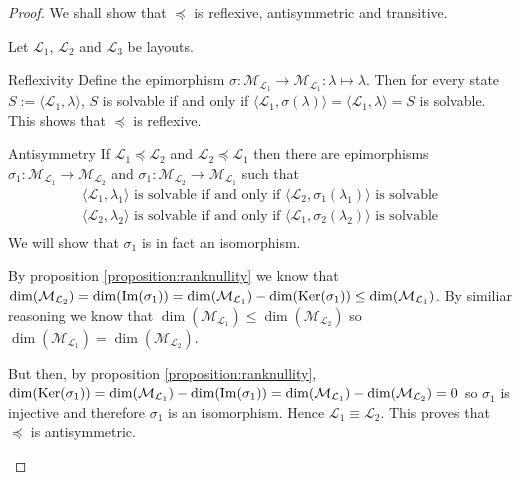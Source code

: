 \begin{proof}
	We shall show that $\preceq$ is reflexive, antisymmetric and transitive.
	
	Let $\mathcal{L}_{1}$, $\mathcal{L}_{2}$ and $\mathcal{L}_{3}$ be
	layouts.
	\begin{namedlist}[Transitivity]
		\item[Reflexivity] Define the epimorphism $\sigma :
		\mathcal{M}_{\mathcal{L}_{1}} \rightarrow
		\mathcal{M}_{\mathcal{L}_{1}} : \lambda \mapsto \lambda$. Then
		for every state $S:=\langle\mathcal{L}_{1},\lambda\rangle$, $S$
		is solvable if and only if
		$\langle\mathcal{L}_{1},\sigma(\lambda)\rangle =
		\langle\mathcal{L}_{1},\lambda\rangle = S$ is solvable. This
		shows that $\preceq$ is reflexive.
		
		\item[Antisymmetry] If $\mathcal{L}_{1} \preceq \mathcal{L}_{2}$
		and $\mathcal{L}_{2} \preceq \mathcal{L}_{1}$ then there are
		epimorphisms $\sigma_{1} : \mathcal{M}_{\mathcal{L}_{1}}
		\rightarrow \mathcal{M}_{\mathcal{L}_{2}}$ and $\sigma_{1} :
		\mathcal{M}_{\mathcal{L}_{2}} \rightarrow
		\mathcal{M}_{\mathcal{L}_{1}}$ such that
		\[
			\begin{array}{c}
				\langle\mathcal{L}_{1},\lambda_{1}\rangle \text{ is solvable if and only if } \langle\mathcal{L}_{2},\sigma_{1}(\lambda_{1})\rangle \text{ is solvable} \\
				\langle\mathcal{L}_{2},\lambda_{2}\rangle \text{ is solvable if and only if } \langle\mathcal{L}_{1},\sigma_{2}(\lambda_{2})\rangle \text{ is solvable} \\
			\end{array}
		\]
		We will show that $\sigma_{1}$ is in fact an isomorphism. 
		
		By proposition \ref{proposition:ranknullity} we know that
		$\dim( \mathcal{M}_{\mathcal{L}_{2}} ) = \dim(\operatorname{Im}(\sigma_{1})) =
		\dim( \mathcal{M}_{\mathcal{L}_{1}} ) - \dim(\operatorname{Ker}(\sigma_{1}))
		\le \dim( \mathcal{M}_{\mathcal{L}_{1}} )$. By similiar
		reasoning we know that $\dim( \mathcal{M}_{\mathcal{L}_{1}} )
		\le \dim( \mathcal{M}_{\mathcal{L}_{2}} )$ so $\dim(
		\mathcal{M}_{\mathcal{L}_{1}} ) = \dim(
		\mathcal{M}_{\mathcal{L}_{2}} )$.
		
		But then, by proposition \ref{proposition:ranknullity},
		$\dim(\operatorname{Ker}(\sigma_{1})) = \dim( \mathcal{M}_{\mathcal{L}_{1}} )
		- \dim(\operatorname{Im}(\sigma_{1})) = \dim( \mathcal{M}_{\mathcal{L}_{1}} )
		- \dim(\mathcal{M}_{\mathcal{L}_{2}} ) = 0$ so $\sigma_{1}$ is
		injective and therefore $\sigma_{1}$ is an isomorphism. Hence
		$\mathcal{L}_{1} \equiv \mathcal{L}_{2}$. This proves that
		$\preceq$ is antisymmetric.
						

\end{namedlist}
\end{proof}
